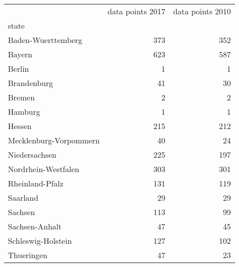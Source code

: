 \begin{tabular}{lrr}
\toprule
{} &  data points 2017 &  data points 2010 \\
state                  &                   &                   \\
\midrule
Baden-Wuerttemberg     &               373 &               352 \\
Bayern                 &               623 &               587 \\
Berlin                 &                 1 &                 1 \\
Brandenburg            &                41 &                30 \\
Bremen                 &                 2 &                 2 \\
Hamburg                &                 1 &                 1 \\
Hessen                 &               215 &               212 \\
Mecklenburg-Vorpommern &                40 &                24 \\
Niedersachsen          &               225 &               197 \\
Nordrhein-Westfalen    &               303 &               301 \\
Rheinland-Pfalz        &               131 &               119 \\
Saarland               &                29 &                29 \\
Sachsen                &               113 &                99 \\
Sachsen-Anhalt         &                47 &                45 \\
Schleswig-Holstein     &               127 &               102 \\
Thueringen             &                47 &                23 \\
\bottomrule
\end{tabular}
